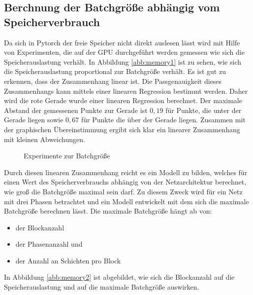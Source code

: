 \subsection{Berchnung der Batchgröße abhängig vom Speicherverbrauch}\label{sec:batch}
Da sich in Pytorch der freie Speicher nicht direkt auslesen lässt wird mit Hilfe von Experimenten, die auf der GPU durchgeführt werden gemessen wie sich die Speicherauslastung verhält. In Abbildung \ref{abb:memory1} ist zu sehen, wie sich die Speicherauslastung proportional zur Batchgröße verhält. Es ist gut zu erkennen, dass der Zusammenhang linear ist. Die Passgenauigkeit dieses Zusammenhangs kann mittels einer linearen Regression bestimmt werden.  Daher wird  die rote Gerade wurde einer linearen Regression berechnet. Der maximale Abstand der gemessenen Punkte zur Gerade ist $0,19$ für Punkte, die unter der Gerade liegen sowie $0,67$ für Punkte die über der Gerade liegen. Zusammen mit der graphischen Übereinstimmung ergibt sich klar ein linearer Zusammenhang mit kleinen Abweichungen.
 \begin{figure}
     \centering
     \caption{Experimente zur Batchgröße}
     \label{abb:memory}
\end{figure}
Durch diesen linearen Zusammenhang reicht es ein Modell zu bilden, welches für einen Wert des Speicherverbrauchs abhängig von der Netzarchitektur berechnet, wie groß die Batchgröße maximal sein darf. Zu diesem Zweck wird für ein Netz mit drei Phasen betrachtet und ein Modell entwickelt mit dem sich die maximale Batchgröße berechnen lässt. Die maximale Batchgröße hängt ab von:
\begin{itemize}
 \item der Blockanzahl
 \item der Phasenanzahl und
 \item der Anzahl an Schichten pro Block
\end{itemize}
In Abbildung \ref{abb:memory2} ist abgebildet, wie sich die Blockanzahl auf die Speicherauslastung und auf die maximale Batchgröße auswirken.



